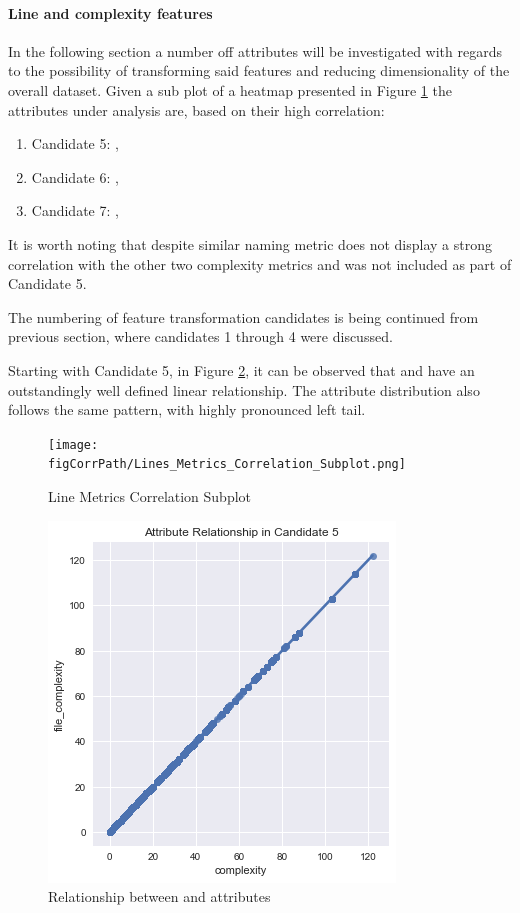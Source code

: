 \paragraph{Line and complexity features}\label{sec:impl-data-analysis:corr:line-and-complexity}
In the following section a number off attributes will be investigated with regards to the possibility of transforming said features and reducing dimensionality of the overall dataset. Given a sub plot of a heatmap presented in Figure \ref{fig:correlation-line-metrics-subplot} the attributes under analysis are, based on their high correlation:
\begin{enumerate}
    \item Candidate 5: \complexity{}, \functionComplexity{}
    \item Candidate 6: \statements{}, \linesToCover{}
    \item Candidate 7: \ncloc{}, \lines{}
\end{enumerate}
It is worth noting that despite similar naming \functionComplexity{} metric does not display a strong correlation with the other two complexity metrics and was not included  as part of Candidate 5.

The numbering of feature transformation candidates is being continued from previous section, where candidates 1 through 4 were discussed.

Starting with Candidate 5, in Figure \ref{fig:candidate5-pairplot}, it can be observed that \complexity{} and \fileComplexity{} have an outstandingly well defined linear relationship. The attribute distribution also follows the same pattern, with highly pronounced left tail. 

\begin{figure}
    \centering
    \texttt{[image: \\figCorrPath/Lines\_Metrics\_Correlation\_Subplot.png]}
    \caption{Line Metrics Correlation Subplot}
    \label{fig:correlation-line-metrics-subplot}
\end{figure}

\begin{figure}[!h]
    \centering
    \includegraphics[scale=0.8]{Figures/correlation/Attribute_Relationship_in_Candidate_5.png}
    \caption{Relationship between \complexity{} and \fileComplexity{} attributes}
    \label{fig:candidate5-pairplot}
\end{figure}

